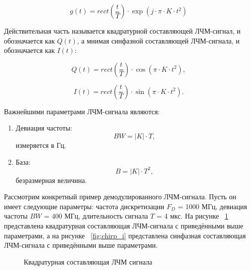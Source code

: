 \begin{equation}	
	g(t) = rect(\frac{t}{T}) \cdot \exp(j \cdot \pi \cdot K \cdot t^{2})
\end{equation}

Действительная часть называется квадратурной
составляющей ЛЧМ-сигнал, и обозначается как \(Q(t)\), а мнимая 
синфазной составляющей ЛЧМ-сигнала, и обозначается как \(I(t)\):

\begin{equation}	
	Q(t) = rect(\frac{t}{T}) \cdot \cos(\pi \cdot K \cdot t^{2}),
\end{equation}

\begin{equation}	
	I(t) = rect(\frac{t}{T}) \cdot \sin(\pi \cdot K \cdot t^{2}).
\end{equation}

Важнейшими параметрами ЛЧМ-сигнала являются:

\begin{enumerate}
	\item Девиация частоты: 
\begin{equation}
	BW = |K| \cdot T, 
\end{equation}
измеряется в Гц.
	\item База: 
\begin{equation}
	B = |K| \cdot T^2, 
\end{equation}
безразмерная величина.
\end{enumerate}

Рассмотрим конкретный пример демодулированного ЛЧМ-сигнала. Пусть он имеет следующие параметры: частота дискретизации \(F_{D}\) = 1000 МГц, девиация частоты \(BW\) = 400 МГц, длительность сигнала \(T\) = 4 мкс. На рисунке ~\ref{fig:chirp_q} представлена квадратурная составляющая ЛЧМ-сигнала с приведёнными выше параметрами, а на рисунке ~\ref{fig:chirp_i} представлена синфазная составляющая ЛЧМ-сигнала с приведёнными выше параметрами.

\begin{figure}[h]
    \centering
    \noindent
    \caption{Квадратурная составляющая ЛЧМ сигнала}
    \label{fig:chirp_q}
\end{figure}

